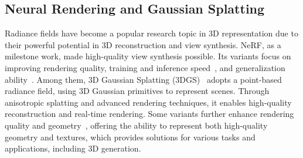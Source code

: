 \subsection{Neural Rendering and Gaussian Splatting}
Radiance fields have become a popular research topic in 3D representation due to their powerful potential in 3D reconstruction and view synthesis. NeRF\cite{mildenhall2021nerf}, as a milestone work, made high-quality view synthesis possible. Its variants focus on improving rendering quality\cite{barron2021mip, barron2022mip,barron2023zip}, training and inference speed~\cite{muller2022instant,fridovich2022plenoxels,hedman2021snerg,SunSC22}, and generalization ability~\cite{wang2021ibrnet,yu2021pixelnerf,chen2021mvsnerf,johari2022geonerf}. Among them, 3D Gaussian Splatting (3DGS)~\cite{kerbl3Dgaussians} adopts a point-based radiance field, using 3D Gaussian primitives to represent scenes. Through anisotropic splatting and advanced rendering techniques, it enables high-quality reconstruction and real-time rendering. Some variants further enhance rendering quality and geometry~\cite{zhang2024rade,huang20242d, Yu2024GOF,lu2024scaffold,yu2024mip}, offering the ability to represent both high-quality geometry and textures, which provides solutions for various tasks and applications, including 3D generation.
